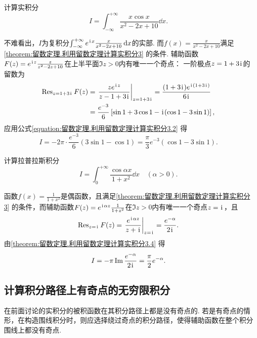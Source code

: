 \begin{example}
计算实积分\[
I = \int_{-\infty}^{+\infty} \frac{x \cos x}{x^2-2x+10} \dd{x}.
\]
\begin{solution}
不难看出，\(I\)为复积分\(\int_{-\infty}^{+\infty} e^{\kern1pt\mathrm{i}\kern1pt x} \frac{x}{x^2-2x+10} \dd{x}\)的实部.
而\(f(x) = \frac{x}{x^2-2x+10}\)满足\cref{theorem:留数定理.利用留数定理计算实积分3} 的条件.
辅助函数\(F(z) = e^{\kern1pt\mathrm{i}\kern1pt z} \frac{z}{z^2-2z+10}\)在上半平面\(\Im z > 0\)内有唯一一个奇点：
一阶极点\(z=1+3\kern1pt\mathrm{i}\kern1pt\)的留数为\begin{align*}
\Res_{z=1+3\iu} F(z)
&= \eval{\frac{z e^{\iu z}}{z-1+3\iu}}_{z=1+3\iu}
= \frac{(1+3\iu) e^{\iu(1+3\iu)}}{6\iu} \\
&= \frac{e^{-3}}{6} \left[ \sin1+3\cos1-\iu(\cos1-3\sin1)\right],
\end{align*}应用公式\cref{equation:留数定理.利用留数定理计算实积分3.2} 得\[
I = -2\pi \cdot \frac{e^{-3}}{6} (3\sin1-\cos1)
= \frac{\pi}{3} e^{-3} (\cos1-3\sin1).
\]
\end{solution}
\end{example}

\begin{example}
计算拉普拉斯积分\[
I = \int_0^{+\infty} \frac{\cos \alpha x}{1+x^2} \dd{x} \quad(\alpha>0).
\]
\begin{solution}
函数\(f(x) = \frac{1}{1+x^2}\)是偶函数，且满足\cref{theorem:留数定理.利用留数定理计算实积分3} 的条件，而辅助函数\(F(z) = e^{\kern1pt\mathrm{i}\kern1pt\alpha z} \frac{1}{1+z^2}\)在\(\Im z > 0\)内有唯一一个奇点\(z=\kern1pt\mathrm{i}\kern1pt\)，且\[
\Res_{z=\iu} F(z) = \eval{\frac{e^{\iu\alpha z}}{z+\iu}}_{z=\iu}
= \frac{e^{-\alpha}}{2\iu}.
\]由\cref{theorem:留数定理.利用留数定理计算实积分3.4} 得\[
I = -\pi \Im \frac{e^{-\alpha}}{2\kern1pt\mathrm{i}\kern1pt}
= \frac{\pi}{2} e^{-\alpha}.
\]
\end{solution}
\end{example}

\subsection{计算积分路径上有奇点的无穷限积分}
在前面讨论的实积分的被积函数在其积分路径上都是没有奇点的.
若是有奇点的情形，在构造围线积分时，则应选择绕过奇点的积分路径，使得辅助函数在整个积分围线上都没有奇点.

